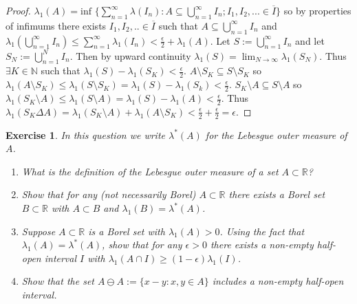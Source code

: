 \documentclass{article}
\newtheorem{exercise}[theorem]{Exercise}
\begin{document}
\begin{proof}
$\lambda_1(A)=\text{inf }\{\sum_{n=1}^\infty\lambda(I_n):A\subseteq\bigcup_{n=1}^\infty I_n;I_1,I_2,...\in \overline{I}\}$ so by properties of infimums there exists $I_1,I_2,..\in\overline{I}$ such that $A\subseteq \bigcup_{n=1}^\infty I_n$ and $\lambda_1(\bigcup_{n=1}^\infty I_n)\leq\sum_{n=1}^\infty\lambda_1(I_n)<\frac{\epsilon}{2}+\lambda_1(A)$. Let $S:=\bigcup_{n=1}^\infty I_n$ and let $S_N:=\bigcup_{n=1}^N I_n$. Then by upward continuity $\lambda_1(S)=\lim_{N\to\infty}\lambda_1(S_N)$. Thus $\exists K\in\mathbb{N}$ such that $\lambda_1(S)-\lambda_1(S_K)<\frac{\epsilon}{2}$. $A\setminus S_K\subseteq S\setminus S_K$ so $\lambda_1(A\setminus S_K)\leq\lambda_1(S\setminus S_K)=\lambda_1(S)-\lambda_1(S_k)<\frac{\epsilon}{2}$. $S_K\setminus A\subseteq S\setminus A$ so $\lambda_1(S_K\setminus A)\leq\lambda_1(S\setminus A)=\lambda_1(S)-\lambda_1(A)<\frac{\epsilon}{2}$. Thus $\lambda_1(S_K\Delta A)=\lambda_1(S_K\setminus A)+\lambda_1(A\setminus S_K)<\frac{\epsilon}{2}+\frac{\epsilon}{2}=\epsilon$.
\end{proof}
\begin{exercise}
    In this question we write $\lambda^*(A)$ for the Lebesgue outer measure of $A$.
    \begin{enumerate}
        \item What is the definition of the \textit{Lebesgue outer measure} of a set $A \subset \mathbb{R}$?
        \item Show that for any (not necessarily Borel) $A \subset \mathbb{R}$ there exists a Borel set $B \subset \mathbb{R}$ with $A \subset B$ and $\lambda_1(B) = \lambda^*(A)$.
        \item Suppose $A \subset \mathbb{R}$ is a Borel set with $\lambda_1(A) > 0$. Using the fact that $\lambda_1(A) = \lambda^*(A)$, show that for any $\epsilon > 0$ there exists a non-empty half-open interval $I$ with $\lambda_1(A \cap I) \geq (1 - \epsilon)\lambda_1(I)$.
        \item Show that the set $A \ominus A := \{x - y : x, y \in A\}$ includes a non-empty half-open interval.
    \end{enumerate}
\end{exercise}
\end{document}
